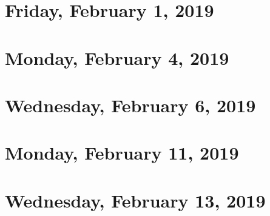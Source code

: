 \documentclass[reqno]{amsart}
\begin{document}
\section{Friday, February 1, 2019}    
    

\section{Monday, February 4, 2019}
    

\section{Wednesday, February 6, 2019}
    

\section{Monday, February 11, 2019}
    

\section{Wednesday, February 13, 2019}
    
\end{document}

